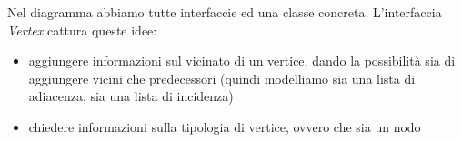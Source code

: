 Nel diagramma abbiamo tutte interfaccie ed una classe concreta.
L'interfaccia \emph{Vertex} cattura queste idee:
\begin{itemize}
\item aggiungere informazioni sul vicinato di un vertice, dando la
  possibilit\`a sia di aggiungere vicini che predecessori (quindi
  modelliamo sia una lista di adiacenza, sia una lista di incidenza)
\item chiedere informazioni sulla tipologia di vertice, ovvero che sia
  un nodo 
\end{itemize}
